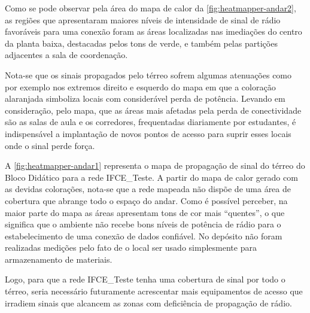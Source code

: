 Como se pode observar pela área do mapa de calor da \autoref{fig:heatmapper-andar2}, as regiões que apresentaram maiores níveis de intensidade de sinal de rádio favoráveis para uma conexão foram as áreas localizadas nas imediações do centro da planta baixa, destacadas pelos tons de verde, e também pelas partições adjacentes a sala de coordenação.

Nota-se que os sinais propagados pelo térreo sofrem algumas atenuações como por exemplo nos extremos direito e esquerdo do mapa em que a coloração alaranjada simboliza locais com considerável perda de potência. Levando em consideração, pelo mapa, que as áreas mais afetadas pela perda de conectividade são as salas de aula e os corredores, frequentadas diariamente por estudantes, é indispensável a implantação de novos pontos de acesso para suprir esses locais onde o sinal perde força.

A \autoref{fig:heatmapper-andar1} representa o mapa de propagação de sinal do térreo do Bloco Didático para a rede IFCE\_Teste. A partir do mapa de calor gerado com as devidas colorações, nota-se que a rede mapeada não dispõe de uma área de cobertura que abrange todo o espaço do andar. Como é possível perceber, na maior parte do mapa as áreas apresentam tons de cor mais ``quentes'', o que significa que o ambiente não recebe bons níveis de potência de rádio para o estabelecimento de uma conexão de dados confiável. No depósito não foram realizadas medições pelo fato de o local ser usado simplesmente para armazenamento de materiais.

Logo, para que a rede IFCE\_Teste tenha uma cobertura de sinal por todo o térreo, seria necessário futuramente acrescentar mais equipamentos de acesso que irradiem sinais que alcancem as zonas com deficiência de propagação de rádio.

\begin{figure}[H]
	\centering
\end{figure}


